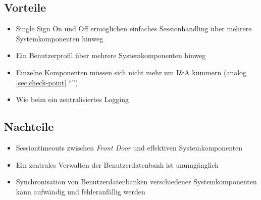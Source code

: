 \subsection*{Vorteile}
\begin{itemize}
	\item Single Sign On und Off ermöglichen einfaches Sessionhandling über mehrere Systemkomponenten hinweg
	\item Ein Benutzerprofil über mehrere Systemkomponenten hinweg
	\item Einzelne Komponenten müssen sich nicht mehr um I\&A kümmern (analog \ref{sec:check-point} ``'')
	\item Wie beim  ein zentralisiertes Logging
\end{itemize}

\subsection*{Nachteile}
\begin{itemize}
	\item Sessiontimeouts zwischen \emph{Front Door} und effektiven Systemkomponenten
	\item Ein zentrales Verwalten der Benutzerdatenbank ist unumgänglich
	\item Synchronisation von Benutzerdatenbanken verschiedener Systemkomponenten kann aufwändig und fehleranfällig werden
\end{itemize}